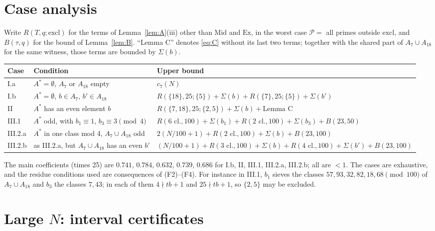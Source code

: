 \documentclass[11pt]{amsart}
\theoremstyle{definition}
\theoremstyle{remark}
\newcommand{\Mid}{\mathrm{Mid}}
\newcommand{\Ex}{\mathrm{Ex}}
\begin{document}
\section{Case analysis}\label{sec:cases}
Write $R(T,q;\mathrm{excl})$ for the terms of Lemma~\ref{lem:A}(iii) other than
$\Mid$ and $\Ex$, in the worst case $\mathcal P=$ all primes outside
$\mathrm{excl}$, and $B(\tau,q)$ for the bound of Lemma~\ref{lem:B}. ``Lemma C''
denotes \eqref{eq:C} without its last two terms; together with the shared part of
$A_7\cup A_{18}$ for the same witness, those terms are bounded by $\Sigma(b)$.

\begin{center}
\renewcommand{\arraystretch}{1.25}
\begin{tabular}{@{}l >{\raggedright\arraybackslash}p{4.2cm} >{\raggedright\arraybackslash}p{9.2cm}@{}}
\toprule
Case & Condition & Upper bound\\
\midrule
I.a & $A^*=\emptyset$, $A_7$ or $A_{18}$ empty & $c_7(N)$\\
I.b & $A^*=\emptyset$, $b\in A_7$, $b'\in A_{18}$ & $R(\{18\},25;\{5\})+\Sigma(b)+R(\{7\},25;\{5\})+\Sigma(b')$\\
II & $A^*$ has an even element $b$ & $R(\{7,18\},25;\{2,5\})+\Sigma(b)+\text{Lemma C}$\\
III.1 & $A^*$ odd, with $b_1\equiv1$, $b_3\equiv3\pmod4$ & $R(6\text{ cl.},100)+\Sigma(b_1)+R(2\text{ cl.},100)+\Sigma(b_3)+B(23,50)$\\
III.2.a & $A^*$ in one class mod 4, $A_7\cup A_{18}$ odd & $2(N/100+1)+R(2\text{ cl.},100)+\Sigma(b)+B(23,100)$\\
III.2.b & as III.2.a, but $A_7\cup A_{18}$ has an even $b'$ & $(N/100+1)+R(3\text{ cl.},100)+\Sigma(b)+R(4\text{ cl.},100)+\Sigma(b')+B(23,100)$\\
\bottomrule
\end{tabular}
\end{center}

The main coefficients (times 25) are $0.741$, $0.784$, $0.632$, $0.739$, $0.686$
for I.b, II, III.1, III.2.a, III.2.b; all are $<1$. The cases are exhaustive, and
the residue conditions used are consequences of (F2)--(F4). For instance in III.1,
$b_1$ sieves the classes $57,93,32,82,18,68\pmod{100}$ of $A_7\cup A_{18}$ and
$b_3$ the classes $7,43$; in each of them $4\nmid tb+1$ and $25\nmid tb+1$, so
$\{2,5\}$ may be excluded.

\section{Large $N$: interval certificates}\label{sec:large}
\end{document}
